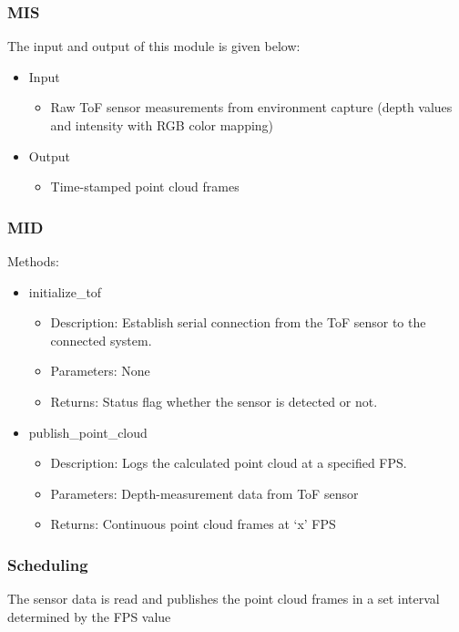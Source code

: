 \documentclass[11pt]{article}
\begin{document}
			\subsubsection{MIS}
				The input and output of this module is given below:
				\begin{itemize}
					\item Input
						\begin{itemize}
							\item Raw ToF sensor measurements from environment capture (depth values and intensity with RGB color mapping)
						\end{itemize}
					\item Output
						\begin{itemize}
							\item Time-stamped point cloud frames
						\end{itemize}
				\end{itemize}
			\subsubsection{MID}
				Methods:
				\begin{itemize}
					\item initialize\_tof
						\begin{itemize}
							\item Description: Establish serial connection from the ToF sensor to the connected system. 
							\item Parameters: None
							\item Returns: Status flag whether the sensor is detected or not. 
						\end{itemize}
					\item publish\_point\_cloud
						\begin{itemize}
							\item Description: Logs the calculated point cloud at a specified FPS. 
							\item Parameters: Depth-measurement data from ToF sensor
							\item Returns: Continuous point cloud frames at `x' FPS
						\end{itemize}
				\end{itemize}
			\subsubsection{Scheduling}
				The sensor data is read and publishes the point cloud frames in a set interval determined by the FPS value
			
\end{document}

